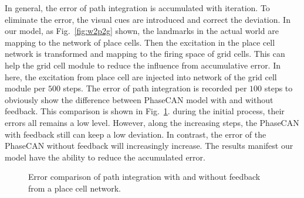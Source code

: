 \documentclass[final,5p,times,twocolumn,authoryear]{elsarticle}
\begin{document}
In general, the error of path integration is accumulated with iteration. To eliminate the error, the visual cues are introduced and correct the deviation. In our model, as Fig.~\ref{fig:w2p2g} shown, the landmarks in the actual world are mapping to the network of place cells. Then the excitation in the place cell network is transformed and mapping to the firing space of grid cells. This can help the grid cell module to reduce the influence from accumulative error. In here, the excitation from place cell are injected into network of the grid cell module per $500$ steps. The error of path integration is recorded per $100$ steps to obviously show the difference between PhaseCAN model with and without feedback. This comparison is shown in Fig.~\ref{fig:path_integration_feedback}. during the initial process, their errors all remains a low level. However, along the increasing steps, the PhaseCAN with feedback still can keep a low deviation. In contrast, the error of the PhaseCAN without feedback will increasingly increase.  The results manifest our model have the ability to reduce the accumulated error.

\begin{figure}[!t]
	\centering
	\caption{Error comparison of path integration with and without feedback from a place cell network.  }
	\label{fig:path_integration_feedback}
\end{figure}
\end{document}
